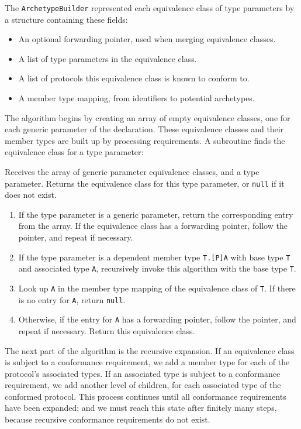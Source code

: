 \documentclass[../generics]{subfiles}
\begin{document}
The \texttt{ArchetypeBuilder} represented each equivalence class of type parameters by a structure containing these fields:
\begin{itemize}
\item An optional forwarding pointer, used when merging equivalence classes.
\item A list of type parameters in the equivalence class.
\item A list of protocols this equivalence class is known to conform to.
\item A member type mapping, from identifiers to potential archetypes.
\end{itemize}

The algorithm begins by creating an array of empty equivalence classes, one for each generic parameter of the declaration. These equivalence classes and their member types are built up by processing requirements. A subroutine finds the equivalence class for a type parameter:
\begin{algorithm}\label{archetype builder lookup} Receives the array of generic parameter equivalence classes, and a type parameter. Returns the equivalence class for this type parameter, or \texttt{null} if it does not exist.
\begin{enumerate}
\item If the type parameter is a generic parameter, return the corresponding entry from the array. If the equivalence class has a forwarding pointer, follow the pointer, and repeat if necessary.
\item If the type parameter is a dependent member type \texttt{T.[P]A} with base type \texttt{T} and associated type \texttt{A}, recursively invoke this algorithm with the base type \texttt{T}.
\item Look up \texttt{A} in the member type mapping of the equivalence class of \texttt{T}. If there is no entry for \texttt{A}, return \texttt{null}.
\item Otherwise, if the entry for \texttt{A} has a forwarding pointer, follow the pointer, and repeat if necessary. Return this equivalence class.
\end{enumerate}
\end{algorithm}
The next part of the algorithm is the recursive expansion. If an equivalence class is subject to a conformance requirement, we add a member type for each of the protocol's associated types. If an associated type is subject to a conformance requirement, we add another level of children, for each associated type of the conformed protocol. This process continues until all conformance requirements have been expanded; and we must reach this state after finitely many steps, because recursive conformance requirements do not exist.
\end{document}
